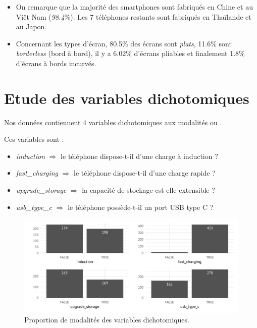 \documentclass[
  12pt,
]{report}
\providecommand{\tightlist}{%
  \setlength{\itemsep}{0pt}\setlength{\parskip}{0pt}}\usepackage{longtable,booktabs,array}
\renewcommand{\texttt}[1]{\colorbox{light}{\color{highlight}{\ttfamily{#1}}}}
\begin{document}
\begin{itemize}
\item
  On remarque que la majorité des smartphones sont fabriqués en Chine et
  au Viêt Nam (\emph{98.4}\%). Les 7 téléphones restants sont fabriqués
  en Thaïlande et au Japon.
\item
  Concernant les types d'écran, 80.5\% des écrans sont \emph{plats},
  11.6\% sont \emph{borderless} (bord à bord), il y a 6.02\% d'écrans
  pliables et finalement 1.8\% d'écrans à bords incurvés.
\end{itemize}

\newpage

\section{Etude des variables
dichotomiques}\label{etude-des-variables-dichotomiques}

Nos données contiennent 4 variables dichotomiques aux modalités
\texttt{TRUE} ou \texttt{FALSE}.

Ces variables sont :

\begin{itemize}
\tightlist
\item
  \emph{induction} \(\Rightarrow\) le téléphone dispose-t-il d'une
  charge à induction ?
\item
  \emph{fast\_charging} \(\Rightarrow\) le téléphone dispose-t-il d'une
  charge rapide ?
\item
  \emph{upgrade\_storage} \(\Rightarrow\) la capacité de stockage
  est-elle extensible ?
\item
  \emph{usb\_type\_c} \(\Rightarrow\) le téléphone possède-t-il un port
  USB type C ?
\end{itemize}

\begin{figure}[H]

{\centering \includegraphics{report_files/figure-pdf/binary_vars-1.pdf}

}

\caption{Proportion de modalités des variables dichotomiques.}

\end{figure}%
\end{document}
